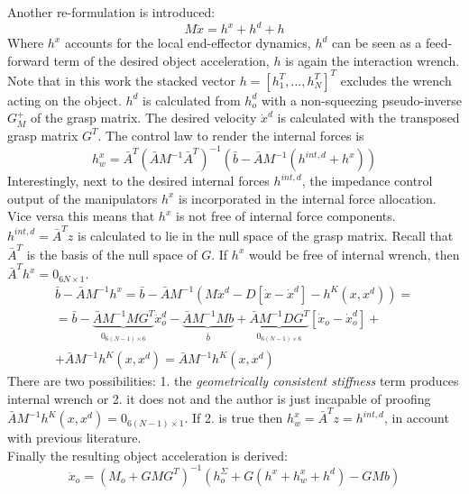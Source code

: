 \documentclass[conference]{IEEEtran}
\begin{document}
Another re-formulation is introduced:
\begin{equation}
M\ddot{x} = h^x + h^d + h
\end{equation}
Where $ h^x $ accounts for the local end-effector dynamics, $ h^d $ can be seen as a feed-forward term of the desired object acceleration, $ h $ is again the interaction wrench. Note that in this work the stacked vector $ h = [h_1^T,...,h_N^T]^T $ excludes the wrench acting on the object. $ h^d $ is calculated from $ h_o^d $ with a non-squeezing pseudo-inverse $ G_M^+ $ of the grasp matrix. The desired velocity $ \dot{x}^d $ is calculated with the transposed grasp matrix $ G^T $.  The control law to render the internal forces is
\begin{equation}
h_w^{x} = \bar{A}^T(\bar{A}M^{-1}\bar{A}^T)^{-1}(\bar{b}-\bar{A}M^{-1}(h^{int,d}+h^x))
\end{equation}
Interestingly, next to the desired internal forces $ h^{int,d} $, the impedance control output of the manipulators $ h^x $ is incorporated in the internal force allocation. Vice versa this means that $ h^x $ is not free of internal force components. $ h^{int,d} = \bar{A}^Tz$ is calculated to lie in the null space of the grasp matrix. Recall that $ \bar{A}^T $ is the basis of the null space of $ G $. If $ h^x $ would be free of internal wrench, then $ \bar{A}^Th^x = 0_{6N\times1} $.
\begin{multline}
\bar{b} - \bar{A}M^{-1}h^x = \bar{b}-\bar{A}M^{-1}(M\ddot{x}^d - D[\dot{x}-\dot{x}^d] - h^K(x,x^d)) =\\
= \bar{b} - \underbrace{\bar{A}M^{-1}MG^T}_{\substack{0_{6(N-1)\times6}}}\ddot{x}_o^d -\underbrace{\bar{A}M^{-1}Mb}_{\substack{\bar{b}}} + \underbrace{\bar{A}M^{-1}DG^T}_{\substack{0_{6(N-1)\times6}}}[\dot{x}_o - \dot{x}_o^d] + \\
+ \bar{A}M^{-1}h^K(x,x^d) = \bar{A}M^{-1}h^K(x,x^d) 
\end{multline}
There are two possibilities: 1. the \textit{geometrically consistent stiffness} term produces internal wrench or 2. it does not and the author is just incapable of proofing $ \bar{A}M^{-1}h^K(x,x^d) = 0_{6(N-1)\times1} $. If 2. is true then $ h^x_w = \bar{A}^Tz = h^{int,d} $, in account with previous literature.\\
Finally the resulting object acceleration is derived:
\begin{equation}
\ddot{x}_o = (M_o + GMG^T)^{-1}(h_o^{\Sigma} + G(h^x + h_w^x + h^d) - GMb)
\end{equation}
\end{document}
